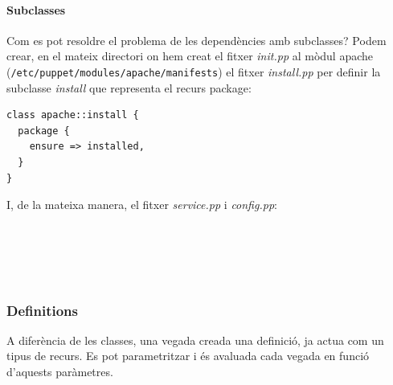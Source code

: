 \documentclass[a4paper]{article}
\begin{document}
\paragraph{Subclasses\\}
Com es pot resoldre el problema de les dependències amb subclasses? Podem crear, en el mateix directori on hem creat el fitxer \textit{init.pp} al mòdul apache (\verb+/etc/puppet/modules/apache/manifests+) el fitxer \textit{install.pp} per definir la subclasse \textit{install} que representa el recurs package:
\begin{verbatim}
class apache::install {
  package {
    ensure => installed,
  }
}
\end{verbatim}
I, de la mateixa manera, el fitxer \textit{service.pp} i \textit{config.pp}:
\begin{figure}[hb]
	\\ 
	\\ 
\end{figure}
\begin{figure}[h]
	\centering
	\\ 
\end{figure}
\subsubsection{Definitions}
A diferència de les classes, una vegada creada una definició, ja actua com un tipus de recurs. Es pot parametritzar i \'es avaluada cada vegada en funció d'aquests paràmetres.
\end{document}
